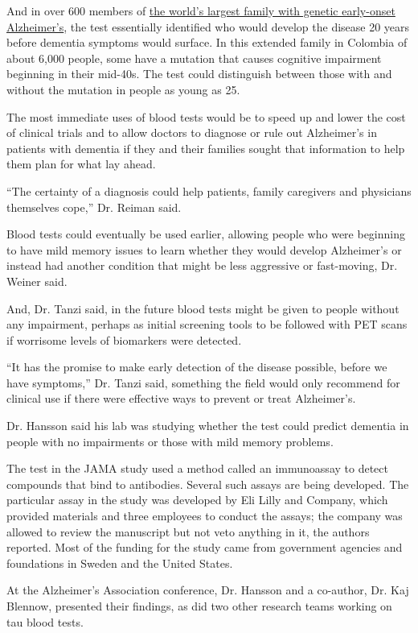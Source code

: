 And in over 600 members of
\href{https://www.nytimes3xbfgragh.onion/2010/06/02/health/02alzheimers.html}{the
world's largest family with genetic early-onset Alzheimer's}, the test
essentially identified who would develop the disease 20 years before
dementia symptoms would surface. In this extended family in Colombia of
about 6,000 people, some have a mutation that causes cognitive
impairment beginning in their mid-40s. The test could distinguish
between those with and without the mutation in people as young as 25.

The most immediate uses of blood tests would be to speed up and lower
the cost of clinical trials and to allow doctors to diagnose or rule out
Alzheimer's in patients with dementia if they and their families sought
that information to help them plan for what lay ahead.

``The certainty of a diagnosis could help patients, family caregivers
and physicians themselves cope,'' Dr. Reiman said.

Blood tests could eventually be used earlier, allowing people who were
beginning to have mild memory issues to learn whether they would develop
Alzheimer's or instead had another condition that might be less
aggressive or fast-moving, Dr. Weiner said.

And, Dr. Tanzi said, in the future blood tests might be given to people
without any impairment, perhaps as initial screening tools to be
followed with PET scans if worrisome levels of biomarkers were detected.

``It has the promise to make early detection of the disease possible,
before we have symptoms,'' Dr. Tanzi said, something the field would
only recommend for clinical use if there were effective ways to prevent
or treat Alzheimer's.

Dr. Hansson said his lab was studying whether the test could predict
dementia in people with no impairments or those with mild memory
problems.

The test in the JAMA study used a method called an immunoassay to detect
compounds that bind to antibodies. Several such assays are being
developed. The particular assay in the study was developed by Eli Lilly
and Company, which provided materials and three employees to conduct the
assays; the company was allowed to review the manuscript but not veto
anything in it, the authors reported. Most of the funding for the study
came from government agencies and foundations in Sweden and the United
States.

At the Alzheimer's Association conference, Dr. Hansson and a co-author,
Dr. Kaj Blennow, presented their findings, as did two other research
teams working on tau blood tests.

